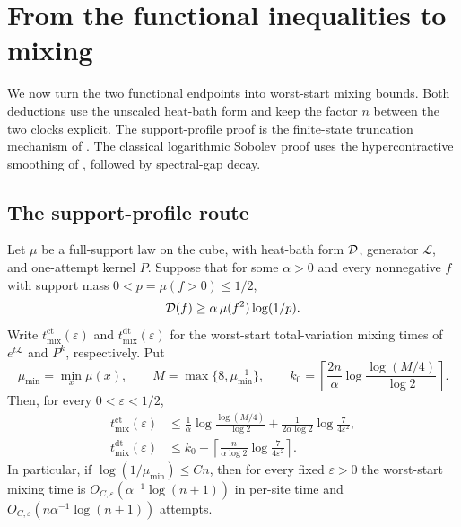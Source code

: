 \section{From the functional inequalities to mixing}\label{sec:dynamics}

We now turn the two functional endpoints into worst-start mixing
bounds. Both deductions use the unscaled heat-bath form and keep the
factor $n$ between the two clocks explicit. The support-profile proof
is the finite-state truncation mechanism of
\cite[Theorem~1.1 and Lemma~2.1]{GMT2006}. The classical logarithmic
Sobolev proof uses the hypercontractive smoothing of
\cite[Theorems~3.5 and~3.7]{DSC1996}, followed by spectral-gap decay.

\subsection{The support-profile route}
\label{prof:mixing-transfer}

\begin{lemma}\label{lem:profile-to-mixing}
Let $\mu$ be a full-support law on the cube, with heat-bath form
$\mathcal D$, generator $\mathcal L$, and one-attempt kernel $P$. Suppose
that for some $\alpha>0$ and every nonnegative $f$ with support mass
$0<p=\mu(f>0)\le1/2$,
\begin{equation}
 \mathcal D(f)\ge \alpha\,\mu(f^2)\log(1/p).
 \label{eq:common-support-profile}
\end{equation}
Write $t_{\mathrm{mix}}^{\mathrm{ct}}(\varepsilon)$ and
$t_{\mathrm{mix}}^{\mathrm{dt}}(\varepsilon)$ for the worst-start
total-variation mixing times of $e^{t\mathcal L}$ and $P^k$, respectively.
Put
\[
 \mu_{\min}=\min_x\mu(x),\qquad
 M=\max\{8,\mu_{\min}^{-1}\},\qquad
 k_0=\left\lceil\frac{2n}\alpha
            \log\frac{\log(M/4)}{\log2}\right\rceil.
\]
Then, for every $0<\varepsilon<1/2$,
\begin{align}
 t_{\mathrm{mix}}^{\mathrm{ct}}(\varepsilon)
 &\le\frac1\alpha\log\frac{\log(M/4)}{\log2}
      +\frac1{2\alpha\log2}\log\frac7{4\varepsilon^2},
 \label{prof:continuous-mixing}\\
 t_{\mathrm{mix}}^{\mathrm{dt}}(\varepsilon)
 &\le k_0+
    \left\lceil\frac n{\alpha\log2}
                       \log\frac7{4\varepsilon^2}\right\rceil.
 \label{prof:discrete-mixing}
\end{align}
In particular, if $\log(1/\mu_{\min})\le Cn$, then for every fixed
$\varepsilon>0$ the worst-start mixing time is
$O_{C,\varepsilon}(\alpha^{-1}\log(n+1))$ in per-site time and
$O_{C,\varepsilon}(n\alpha^{-1}\log(n+1))$ attempts.
\end{lemma}

